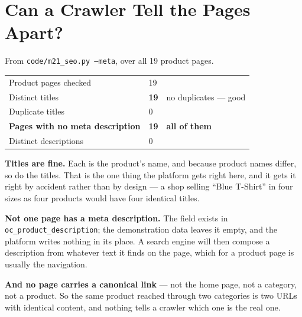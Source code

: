 \section{Can a Crawler Tell the Pages Apart?}

\begin{measured}
From \texttt{code/m21\_seo.py --meta}, over all 19 product pages.

\smallskip
\begin{tabular}{@{}L{7.4cm}L{2.4cm}L{4.2cm}@{}}
Product pages checked & 19 & \\
Distinct titles & \textbf{19} & no duplicates --- good \\
Duplicate titles & 0 & \\
\textbf{Pages with no meta description} & \textbf{19} & \textbf{all of them} \\
Distinct descriptions & 0 & \\
\end{tabular}

\smallskip
\textbf{Titles are fine.} Each is the product's name, and because product names
differ, so do the titles. That is the one thing the platform gets right here,
and it gets it right by accident rather than by design --- a shop selling
``Blue T-Shirt'' in four sizes as four products would have four identical
titles.

\smallskip
\textbf{Not one page has a meta description.} The field exists in
\texttt{oc\_product\_description}; the demonstration data leaves it empty, and
the platform writes nothing in its place. A search engine will then compose a
description from whatever text it finds on the page, which for a product page
is usually the navigation.

\smallskip
\textbf{And no page carries a canonical link} --- not the home page, not a
category, not a product. So the same product reached through two categories is
two URLs with identical content, and nothing tells a crawler which one is the
real one.
\end{measured}

